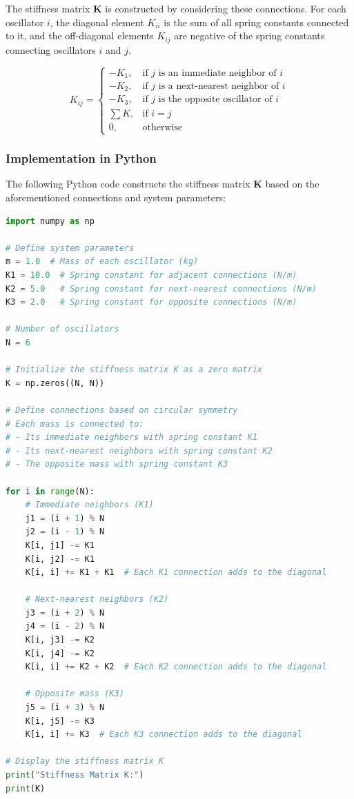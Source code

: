 \documentclass[12pt]{report} %
\begin{document}
The stiffness matrix \( \mathbf{K} \) is constructed by considering these connections. For each oscillator \( i \), the diagonal element \( K_{ii} \) is the sum of all spring constants connected to it, and the off-diagonal elements \( K_{ij} \) are negative of the spring constants connecting oscillators \( i \) and \( j \).

\[
K_{ij} =
\begin{cases}
- K_1, & \text{if } j \text{ is an immediate neighbor of } i \\
- K_2, & \text{if } j \text{ is a next-nearest neighbor of } i \\
- K_3, & \text{if } j \text{ is the opposite oscillator of } i \\
\sum K, & \text{if } i = j \\
0, & \text{otherwise}
\end{cases}
\]

\subsubsection{Implementation in Python}
\label{subsubsec:part2_task2_K_matrix_code}

The following Python code constructs the stiffness matrix \( \mathbf{K} \) based on the aforementioned connections and system parameters:

\begin{lstlisting}[language=Python, caption={Constructing the Stiffness Matrix \( \mathbf{K} \)}, label={lst:K_matrix_task2}]
import numpy as np

# Define system parameters
m = 1.0  # Mass of each oscillator (kg)
K1 = 10.0  # Spring constant for adjacent connections (N/m)
K2 = 5.0   # Spring constant for next-nearest connections (N/m)
K3 = 2.0   # Spring constant for opposite connections (N/m)

# Number of oscillators
N = 6

# Initialize the stiffness matrix K as a zero matrix
K = np.zeros((N, N))

# Define connections based on circular symmetry
# Each mass is connected to:
# - Its immediate neighbors with spring constant K1
# - Its next-nearest neighbors with spring constant K2
# - The opposite mass with spring constant K3

for i in range(N):
    # Immediate neighbors (K1)
    j1 = (i + 1) % N
    j2 = (i - 1) % N
    K[i, j1] -= K1
    K[i, j2] -= K1
    K[i, i] += K1 + K1  # Each K1 connection adds to the diagonal
    
    # Next-nearest neighbors (K2)
    j3 = (i + 2) % N
    j4 = (i - 2) % N
    K[i, j3] -= K2
    K[i, j4] -= K2
    K[i, i] += K2 + K2  # Each K2 connection adds to the diagonal
    
    # Opposite mass (K3)
    j5 = (i + 3) % N
    K[i, j5] -= K3
    K[i, i] += K3  # Each K3 connection adds to the diagonal

# Display the stiffness matrix K
print("Stiffness Matrix K:")
print(K)
\end{lstlisting}
\end{document}
